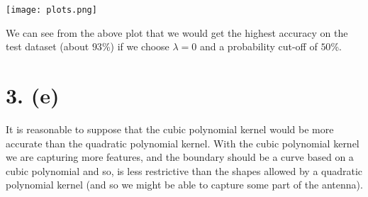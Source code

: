 \documentclass[]{article}
\begin{document}
\texttt{[image: plots.png]}

We can see from the above plot that we would get the highest accuracy on
the test dataset (about \(93\)\%) if we choose \(\lambda=0\) and a
probability cut-off of \(50\)\%.

\hypertarget{e}{%
\section{3. (e)}\label{e}}

It is reasonable to suppose that the cubic polynomial kernel would be
more accurate than the quadratic polynomial kernel. With the cubic
polynomial kernel we are capturing more features, and the boundary
should be a curve based on a cubic polynomial and so, is less
restrictive than the shapes allowed by a quadratic polynomial kernel
(and so we might be able to capture some part of the antenna).
\end{document}
